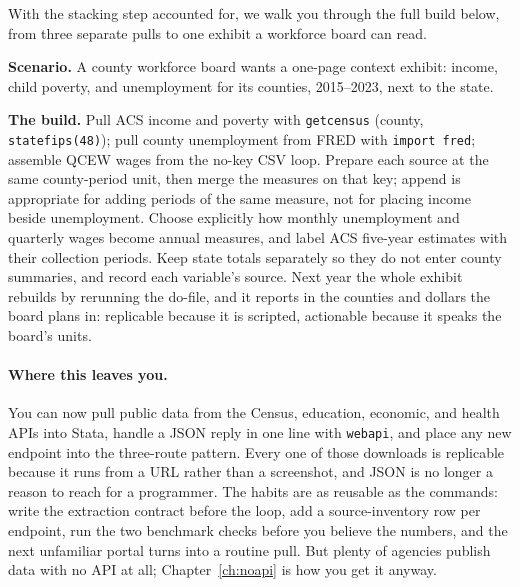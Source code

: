 \documentclass[
    a4paper,
    fontsize=10pt,
    twoside=true,
    numbers=noenddot,
]{kaobook}
\newcounter{appliedexample}
\newenvironment{appliedexample}[1][]{%
    \refstepcounter{appliedexample}%
    \begin{appliedexamplebox}[frametitle={Applied Example~\theappliedexample.~~#1}]%
}{%
    \end{appliedexamplebox}%
}
\begin{document}
With the stacking step accounted for, we walk you through the full build below, from three separate pulls to one exhibit a workforce board can read.

\begin{appliedexample}[A Texas county panel from three APIs]\label{ae:ch03-countypanel}
\textbf{Scenario.} A county workforce board wants a one-page context exhibit: income, child poverty, and unemployment for its counties, 2015--2023, next to the state.

\medskip
\textbf{The build.} Pull ACS income and poverty with \texttt{getcensus} (county, \texttt{statefips(48)}); pull county unemployment from FRED with \texttt{import fred}; assemble QCEW wages from the no-key CSV loop. Prepare each source at the same county-period unit, then merge the measures on that key; append is appropriate for adding periods of the same measure, not for placing income beside unemployment. Choose explicitly how monthly unemployment and quarterly wages become annual measures, and label ACS five-year estimates with their collection periods. Keep state totals separately so they do not enter county summaries, and record each variable's source. Next year the whole exhibit rebuilds by rerunning the do-file, and it reports in the counties and dollars the board plans in: replicable because it is scripted, actionable because it speaks the board's units.
\end{appliedexample}

\paragraph{Where this leaves you.} You can now pull public data from the Census, education, economic, and health APIs into Stata, handle a JSON reply in one line with \texttt{webapi}, and place any new endpoint into the three-route pattern. Every one of those downloads is replicable because it runs from a URL rather than a screenshot, and JSON is no longer a reason to reach for a programmer. The habits are as reusable as the commands: write the extraction contract before the loop, add a source-inventory row per endpoint, run the two benchmark checks before you believe the numbers, and the next unfamiliar portal turns into a routine pull. But plenty of agencies publish data with no API at all; Chapter~\ref{ch:noapi} is how you get it anyway.
\end{document}
